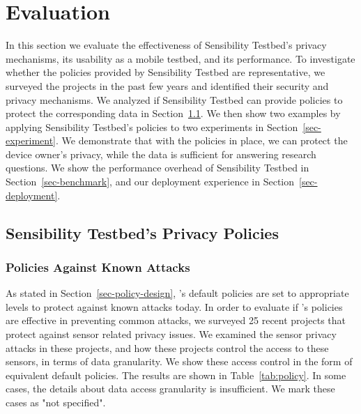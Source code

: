 \section{Evaluation}\label{sec-eval}

In this section we evaluate the effectiveness of Sensibility Testbed's 
privacy mechanisms, its usability as a mobile testbed, and its 
performance. To investigate whether the policies provided by 
Sensibility Testbed are representative, we surveyed the projects
in the past few years and identified their security and privacy 
mechanisms. We analyzed if Sensibility Testbed can provide policies 
to protect the corresponding data in Section~\ref{sec-our-policies}. 
We then show two examples by applying Sensibility Testbed's 
policies to two experiments in Section~\ref{sec-experiment}. We 
demonstrate that with the policies in place, we can protect the 
device owner's privacy, while the data is sufficient for answering 
research questions. We show the performance overhead of 
Sensibility Testbed in Section~\ref{sec-benchmark}, and our 
deployment experience in Section~\ref{sec-deployment}.

\subsection{Sensibility Testbed's Privacy Policies}\label{sec-our-policies}

\subsubsection{Policies Against Known Attacks}
As stated in Section~\ref{sec-policy-design}, \sysname's default policies are 
set to appropriate levels to protect against known attacks today. In order to 
evaluate if \sysname's policies are effective in preventing common attacks, 
we surveyed 25 recent projects that 
protect against sensor related privacy issues. We examined the sensor 
privacy attacks in these projects, and how these projects control the access 
to these sensors, in terms of data granularity. We show these access control 
in the form of equivalent \sysname default policies. The results are shown in 
Table~\ref{tab:policy}. In some cases, the details about data access granularity
is insufficient. We mark these cases as "not specified". 

